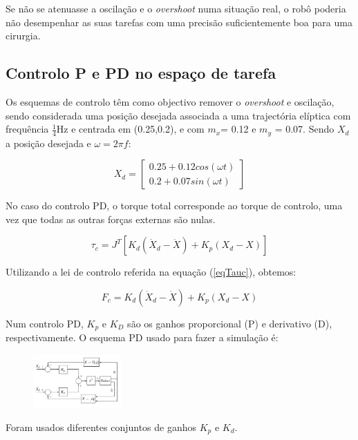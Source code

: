 \documentclass[a4paper,twocolumn,final,11pt]{article}
\let\oldref\ref
\renewcommand{\ref}[1]{(\oldref{#1})}
\begin{document}
Se não se atenuasse a oscilação e o \textit{overshoot} numa situação real, o robô poderia não desempenhar as suas tarefas com uma precisão suficientemente boa para uma cirurgia. 

\subsection{Controlo P e PD no espaço de tarefa}

Os esquemas de controlo têm como objectivo remover o \textit{overshoot} e oscilação, sendo considerada uma posição desejada associada a uma trajectória elíptica com frequência $\frac {1}{4}$Hz e centrada em (0.25,0.2), e com $m_x$= 0.12 e $m_y$ = 0.07.
Sendo $X_d$ a posição desejada e $\omega=2\pi f$:

\begin{equation}
X_d=
\begin{bmatrix}
0.25 +  0.12cos(\omega t)\\
0.2 + 0.07sin(\omega t)
\end{bmatrix}
\end{equation}

No caso do controlo PD, o torque total corresponde ao torque de controlo, uma vez que todas as outras forças externas são nulas.

\begin{equation}
    \tau_c = J^{T}[K_d(\dot{X}_d -\dot{X}) + K_p(X_d -X)]
\end{equation}

Utilizando a lei de controlo referida na equação \ref{eqTauc}, obtemos:

\begin{equation}
    F_c=K_d(\dot{X}_d - \dot{X}) + K_p(X_d - X)
\end{equation}

Num controlo PD, $K_p$ e $K_D$ são os ganhos proporcional (P) e derivativo (D), respectivamente.
O esquema PD usado para fazer a simulação é:

\begin{figure}[H]
	\centering
	\includegraphics[width=0.3\textwidth]{esquemaPD.png}
	\caption{\cite{Cortesão}}
  \label{}
\end{figure}

Foram usados diferentes conjuntos de ganhos $K_p$ e $K_d$.
\end{document}
